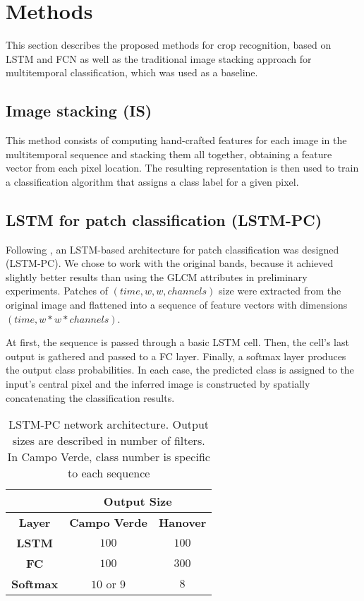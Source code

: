 \section{Methods}

This section describes the proposed methods for crop recognition, based on LSTM and FCN as well as the traditional image stacking \cite{schneider2012monitoring,schneider2008compact} approach for multitemporal classification, which was used as a baseline.

\subsection{Image stacking (IS)}

This method consists of computing hand-crafted features for each image in the multitemporal sequence and stacking them all together, obtaining a feature vector from each pixel location. The resulting representation is then used to train a classification algorithm that assigns a class label for a given pixel. 

\subsection{LSTM for patch classification (LSTM-PC)}

Following \cite{rnnjose}, an LSTM-based architecture for patch classification was designed (LSTM-PC). We chose to work with the original bands, because it achieved slightly better results than using the GLCM attributes in preliminary experiments. Patches of $(time, w, w, channels)$ size were extracted from the original image and flattened into a sequence of feature vectors with dimensions $(time, w*w*channels)$. 

At first, the sequence is passed through a basic LSTM cell. Then, the cell's last output is gathered and passed to a FC layer. Finally, a softmax layer produces the output class probabilities. In each case, the predicted class is assigned to the input's central pixel and the inferred image is constructed by spatially concatenating the classification results. \vspace{0.5cm}
\begin{table}[h!]
\centering
\caption{LSTM-PC network architecture. Output sizes are described in number of filters. In Campo Verde, class number is specific to each sequence}
\label{table:lstm}
\begin{tabular}{|c|c|c|}
\hline
\multicolumn{1}{|l|}{} & \multicolumn{2}{c|}{\textbf{Output Size}} \\ \hline
\textbf{Layer} & \textbf{Campo Verde} & \textbf{Hanover} \\ \hline
\textbf{LSTM} & $100$ & $100$ \\ \hline
\textbf{FC} & $100$ & $300$ \\ \hline
\textbf{Softmax} & $10$ or $9$ & $8$ \\ \hline
\end{tabular}
\end{table}

